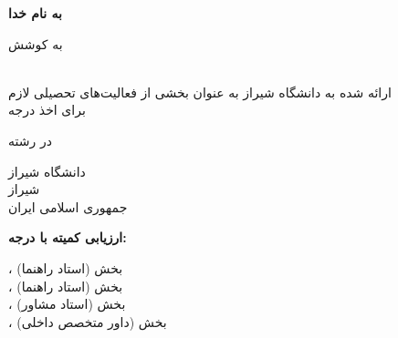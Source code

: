 {
\centering
\textbf{به نام خدا}

\vspace{\baselineskip}
\textbf{\PersianTitle}

\vspace{\baselineskip}
به کوشش \\
\textbf{\PersianName}

\vspace{\baselineskip}
{\PersianType} \\
ارائه شده به دانشگاه شیراز به عنوان بخشی از فعالیت‌های تحصیلی لازم \\ برای اخذ درجه {\PersianDegree}

\vspace{\baselineskip}
در رشته \\
{\PersianField}

\vspace{\baselineskip}
دانشگاه شیراز \\
شیراز \\
جمهوری اسلامی ایران \par
}

\vspace{\baselineskip}
\textbf{ارزیابی کمیته {\PersianType} با درجه: {\PersianGrade}}

{\PersianSupervisor}، {\PersianSupervisorTitle} بخش {\PersianSupervisorDepartment} (استاد راهنما) \dotfill \\
{\PersianSupervisorB}، {\PersianSupervisorTitleB} بخش {\PersianSupervisorDepartmentB} (استاد راهنما) \dotfill \\
{\PersianAdvisor}، {\PersianAdvisorTitle} بخش {\PersianAdvisorDepartment} (استاد مشاور) \dotfill \\
{\PersianReferee}، {\PersianRefereeTitle} بخش {\PersianRefereeDepartment} (داور متخصص داخلی) \dotfill

\vspace{\baselineskip}
\centerline{\PersianDate}
